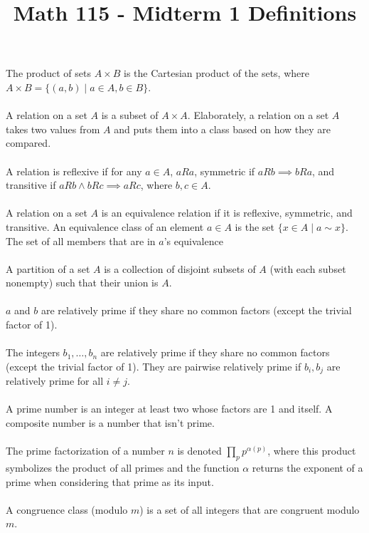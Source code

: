 \documentclass[12pt]{article}
\theoremstyle{definition}
\theoremstyle{named}
\begin{document}
\title{Math 115 - Midterm 1 Definitions}
\author{}
\date{}
\maketitle
\date

\noindent The product of sets $A \times B$ is the Cartesian product of the sets, where $A \times B = \{(a,b) \mid a \in A, b \in B\}$. 
\\
\\
A relation on a set $A$ is a subset of $A \times A$. Elaborately, a relation on a set $A$ takes two values from $A$ and puts them into a class based on how they are compared. 
\\
\\
A relation is reflexive if for any $a \in A$, $aRa$, symmetric if $aRb \implies bRa$, and transitive if $aRb \land bRc \implies aRc$, where $b,c \in A$. 
\\
\\
A relation on a set $A$ is an equivalence relation if it is reflexive, symmetric, and transitive. An equivalence class of an element $a \in A$ is the set $\{x \in A \mid a \sim x\}$. The set of all members that are in $a$'s equivalence 
\\
\\
A partition of a set $A$ is a collection of disjoint subsets of $A$ (with each subset nonempty) such that their union is $A$. 
\\
\\
$a$ and $b$ are relatively prime if they share no common factors (except the trivial factor of 1). 
\\
\\
The integers $b_1,\dots,b_n$ are relatively prime if they share no common factors (except the trivial factor of 1). They are pairwise relatively prime if $b_i,b_j$ are relatively prime for all $i \neq j$. 
\\
\\
A prime number is an integer at least two whose factors are 1 and itself. A composite number is a number that isn't prime. 
\\
\\
The prime factorization of a number $n$ is denoted $\prod_p p^{\alpha(p)}$, where this product symbolizes the product of all primes and the function $\alpha$ returns the exponent of a prime when considering that prime as its input.
\\
\\
A congruence class (modulo $m$) is a set of all integers that are congruent modulo $m$. 
\end{document}
